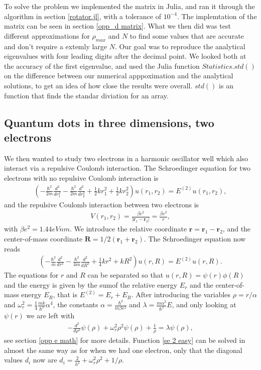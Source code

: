 \documentclass[a4paper]{article}
\begin{document}
To solve the problem we implemented the matrix in Julia, and ran it through the algorithm in section \ref{rotator.jl}, with a tolerance of $10^{-4}$. The implemtation of the matrix can be seen in section \ref{opp_d matrix}. What we then did was test different approximations for $\rho_{max}$ and $N$ to find some values that are accurate and don't require a extemly large $N$. Our goal was to reproduce the analytical eigenvalues with four leading digits after the decimal point. We looked both at the accuracy of the first eigenvalue, and used the Julia function $Statistics.std()$ on the difference between our numerical apppoximation and the analytical solutions, to get an idea of how close the results were overall. $std()$ is an function that finds the standar diviation for an array.


\subsection{Quantum dots in three dimensions, two electrons}
We then wanted to study two electrons in a harmonic oscillator well which also interact via a repulsive Coulomb interaction. The Schroedinger equation for two electrons with no repulsive Coulomb interaction is
\begin{align}
\left(  -\frac{\hbar^2}{2 m} \frac{d^2}{dr_1^2} -\frac{\hbar^2}{2 m} \frac{d^2}{dr_2^2}+ \frac{1}{2}k r_1^2+ \frac{1}{2}k r_2^2\right)u(r_1,r_2)  = E^{(2)} u(r_1,r_2) ,
\end{align}
and the repulsive Coulomb interaction between two electrons is
\begin{align}
V(r_1,r_2) = \frac{\beta e^2}{|\mathbf{r}_1-\mathbf{r}_2|}=\frac{\beta e^2}{r},
\end{align}
with $ \beta e^2 = 1.44 eVnm$. We introduce the relative coordinate $\mathbf{r} = \mathbf{r}_1-\mathbf{r}_2$, and the center-of-mass coordinate $\mathbf{R} = 1/2(\mathbf{r}_1+\mathbf{r}_2)$. The Schroedinger equation now reads
\begin{align}
\left(  -\frac{\hbar^2}{m} \frac{d^2}{dr^2} -\frac{\hbar^2}{4 m} \frac{d^2}{dR^2}+ \frac{1}{4} k r^2+  kR^2\right)u(r,R)  = E^{(2)} u(r,R).
\end{align}
The equations for $r$ and $R$ can be separated so that $u(r,R) = \psi(r)\phi(R)$ and the energy is given by the sumof the relative energy $E_r$ and the center-of-mass energy $E_R$, that is $ E^{(2)} = E_r + E_R$. After introducing the variables $\rho = r/\alpha$ and $\omega_r^2=\frac{1}{4}\frac{mk}{\hbar^2} \alpha^4$, the constants $\alpha = \frac{\hbar^2}{m\beta e^2}$ and $\lambda = \frac{m\alpha^2}{\hbar^2}E$, and only looking at $\psi (r)$ we are left with 
\begin{align}
  -\frac{d^2}{d\rho^2} \psi(\rho) + \omega_r^2\rho^2\psi(\rho) +\frac{1}{\rho} = \lambda \psi(\rho), \label{se 2 easy}
\end{align}
see section \ref{opp e math} for more details. Function \ref{se 2 easy} can be solved in almost the same way as for when we had one electron, only that the diagonal values $d_i$ now are $d_i = \frac{2}{h^2} + \omega_r^2\rho^2+1/\rho$. 
\end{document}
